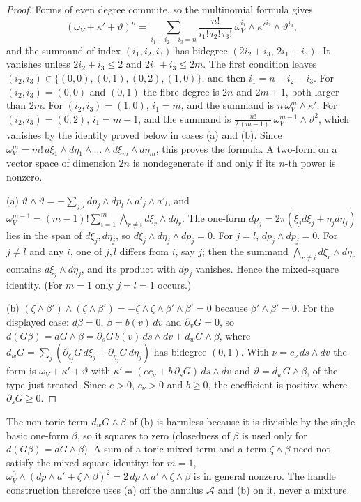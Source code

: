 \begin{proof}
Forms of even degree commute, so the multinomial formula gives
\[
 (\omega_V+\kappa'+\vartheta)^n=\sum_{i_1+i_2+i_3=n}\frac{n!}{i_1!\,i_2!\,i_3!}\,\omega_V^{i_1}\wedge\kappa'^{i_2}\wedge\vartheta^{i_3} ,
\]
and the summand of index $(i_1,i_2,i_3)$ has bidegree $(2i_2+i_3,\,2i_1+i_3)$. It vanishes unless $2i_2+i_3\le2$ and
$2i_1+i_3\le2m$. The first condition leaves $(i_2,i_3)\in\{(0,0),(0,1),(0,2),(1,0)\}$, and then $i_1=n-i_2-i_3$. For
$(i_2,i_3)=(0,0)$ and $(0,1)$ the fibre degree is $2n$ and $2m+1$, both larger than $2m$. For $(i_2,i_3)=(1,0)$, $i_1=m$,
and the summand is $n\,\omega_V^m\wedge\kappa'$. For $(i_2,i_3)=(0,2)$, $i_1=m-1$, and the summand is
$\frac{n!}{2\,(m-1)!}\,\omega_V^{m-1}\wedge\vartheta^2$, which vanishes by the identity proved below in cases (a) and (b). Since
$\omega_V^m=m!\,d\xi_1\wedge d\eta_1\wedge\dots\wedge d\xi_m\wedge d\eta_m$, this proves the formula. A two-form on a vector space of
dimension $2n$ is nondegenerate if and only if its $n$-th power is nonzero.

(a) $\vartheta\wedge\vartheta=-\sum_{j,l}dp_j\wedge dp_l\wedge a'_j\wedge a'_l$, and
$\omega_V^{m-1}=(m-1)!\sum_{i=1}^m\bigwedge_{r\ne i}d\xi_r\wedge d\eta_r$. The one-form
$dp_j=2\pi(\xi_jd\xi_j+\eta_jd\eta_j)$ lies in the span of $d\xi_j,d\eta_j$, so $d\xi_j\wedge d\eta_j\wedge dp_j=0$. For $j=l$,
$dp_j\wedge dp_j=0$. For $j\ne l$ and any $i$, one of $j,l$ differs from $i$, say $j$; then the summand
$\bigwedge_{r\ne i}d\xi_r\wedge d\eta_r$ contains $d\xi_j\wedge d\eta_j$, and its product with $dp_j$ vanishes. Hence
the mixed-square identity. (For $m=1$ only $j=l=1$ occurs.)

(b) $(\zeta\wedge\beta')\wedge(\zeta\wedge\beta')=-\zeta\wedge\zeta\wedge\beta'\wedge\beta'=0$ because $\beta'\wedge\beta'=0$. For the displayed
case: $d\beta=0$, $\beta=b(v)\,dv$ and $\partial_vG=0$, so $d(G\beta)=dG\wedge\beta=\partial_sG\,b(v)\,ds\wedge dv+d_wG\wedge\beta$, where
$d_wG=\sum_j(\partial_{\xi_j}G\,d\xi_j+\partial_{\eta_j}G\,d\eta_j)$ has bidegree $(0,1)$. With $\nu=c_\nu\,ds\wedge dv$ the form is
$\omega_V+\kappa'+\vartheta$ with $\kappa'=(ec_\nu+b\,\partial_sG)\,ds\wedge dv$ and $\vartheta=d_wG\wedge\beta$, of the type just treated.
Since $e>0$, $c_\nu>0$ and $b\ge0$, the coefficient is positive where $\partial_sG\ge0$.
\end{proof}

The non-toric term $d_wG\wedge\beta$ of (b) is harmless because it is divisible by the single basic one-form
$\beta$, so it squares to zero (closedness of $\beta$ is used only for $d(G\beta)=dG\wedge\beta$). A sum of a toric mixed
term and a term $\zeta\wedge\beta$ need not satisfy the mixed-square identity: for $m=1$,
$\omega_V^0\wedge(dp\wedge a'+\zeta\wedge\beta)^2=2\,dp\wedge a'\wedge\zeta\wedge\beta$ is in general nonzero. The handle construction
therefore uses (a) off the annulus $\mathcal A$ and (b) on it, never a mixture.

